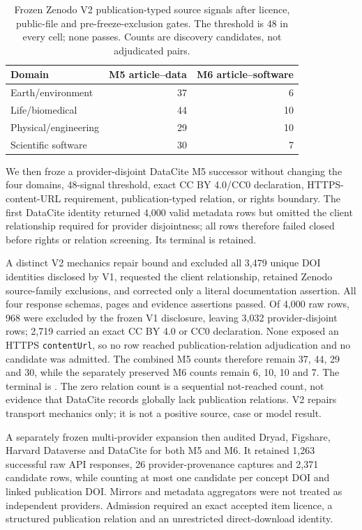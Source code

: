 \begin{table}[t]
\centering
\small
\caption{Frozen Zenodo V2 publication-typed source signals after licence,
public-file and pre-freeze-exclusion gates.  The threshold is 48 in every cell;
none passes.  Counts are discovery candidates, not adjudicated pairs.}
\label{tab:p4-zenodo-source-signals}
\begin{tabular}{lrr}
\toprule
Domain & M5 article--data & M6 article--software \\
\midrule
Earth/environment & 37 & 6 \\
Life/biomedical & 44 & 10 \\
Physical/engineering & 29 & 10 \\
Scientific software & 30 & 7 \\
\bottomrule
\end{tabular}
\end{table}

We then froze a provider-disjoint DataCite M5 successor without changing the
four domains, 48-signal threshold, exact CC BY 4.0/CC0 declaration,
HTTPS-content-URL requirement, publication-typed relation, or rights boundary.
The first DataCite identity returned 4,000 valid metadata rows but omitted the
client relationship required for provider disjointness; all rows therefore
failed closed before rights or relation screening. Its terminal
 is retained.

A distinct V2 mechanics repair bound and excluded all 3,479 unique DOI
identities disclosed by V1, requested the client relationship, retained Zenodo
source-family exclusions, and corrected only a literal documentation assertion.
All four response schemas, pages and evidence assertions passed. Of 4,000 raw
rows, 968 were excluded by the frozen V1 disclosure, leaving 3,032
provider-disjoint rows; 2,719 carried an exact CC BY 4.0 or CC0 declaration.
None exposed an HTTPS \texttt{contentUrl}, so no row reached publication-relation
adjudication and no candidate was admitted. The combined M5 counts therefore
remain 37, 44, 29 and 30, while the separately preserved M6 counts remain 6,
10, 10 and 7. The terminal is
.
The zero relation count is a sequential not-reached count, not evidence that
DataCite records globally lack publication relations. V2 repairs transport
mechanics only; it is not a positive source, case or model result.

A separately frozen multi-provider expansion then audited Dryad, Figshare,
Harvard Dataverse and DataCite for both M5 and M6. It retained 1,263 successful
raw API responses, 26 provider-provenance captures and 2,371 candidate rows,
while counting at most one candidate per concept DOI and linked publication
DOI. Mirrors and metadata aggregators were not treated as independent
providers. Admission required an exact accepted item licence, a structured
publication relation and an unrestricted direct-download identity.

